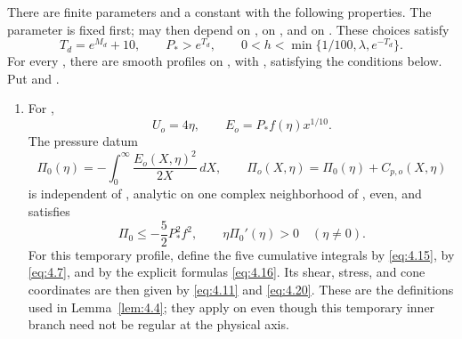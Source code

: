 \begin{lemma}\label{lem:4.8}
There are finite parameters  and a constant  with the following properties. The parameter  is fixed first;  may then depend on ,  on , and  on . These choices satisfy
\[
  T_d=e^{M_d}+10,\qquad P_\ast>e^{T_d},\qquad
  0<h<\min\{1/100,\lambda,e^{-T_d}\}.
\]
For every , there are smooth profiles  on , with , satisfying the conditions below. Put  and .
\begin{enumerate}[label=(\roman*)]
\item For ,
\[
  U_o=4\eta,\qquad E_o=P_\ast f(\eta)x^{1/10}.
\]
The pressure datum
\begin{equation}
  \Pi_0(\eta)=-\int_0^\infty\frac{E_o(X,\eta)^2}{2X}\,dX,
  \qquad
  \Pi_o(X,\eta)=\Pi_0(\eta)+C_{p,o}(X,\eta)
  \tag{4.31}\label{eq:4.31}
\end{equation}
is independent of , analytic on one complex neighborhood of , even, and satisfies
\[
  \Pi_0\leq-\frac52P_\ast^2f^2,\qquad \eta\Pi_0'(\eta)>0\quad(\eta\neq0).
\]
For this temporary profile, define the five cumulative integrals by \eqref{eq:4.15},  by \eqref{eq:4.7}, and  by the explicit formulas \eqref{eq:4.16}. Its shear, stress, and cone coordinates are then given by \eqref{eq:4.11} and \eqref{eq:4.20}. These are the definitions used in Lemma~\ref{lem:4.4}; they apply on  even though this temporary inner branch need not be regular at the physical axis.


\end{enumerate}
\end{lemma}
